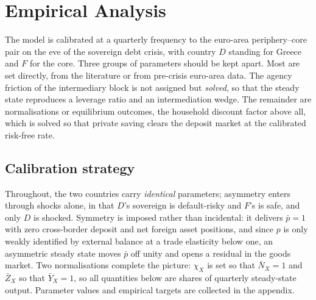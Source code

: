 \section{Empirical Analysis}
\label{sec:analysis}

The model is calibrated at a quarterly frequency to the euro-area
periphery--core pair on the eve of the sovereign debt crisis, with country $D$
standing for Greece and $F$ for the core. Three groups of parameters should be
kept apart. Most are set directly, from the literature or from pre-crisis
euro-area data. The agency friction of the intermediary block is not assigned but
\emph{solved}, so that the steady state reproduces a leverage ratio and an
intermediation wedge. The remainder are normalisations or equilibrium outcomes,
the household discount factor above all, which is solved so that private saving
clears the deposit market at the calibrated risk-free rate.

\subsection{Calibration strategy}
\label{sec:calibration}

Throughout, the two countries carry \emph{identical} parameters; asymmetry
enters through shocks alone, in that $D$'s sovereign is default-risky and $F$'s
is safe, and only $D$ is shocked. Symmetry is imposed rather than incidental: it
delivers $\bar p=1$ with zero cross-border deposit and net foreign asset
positions, and since $p$ is only weakly identified by external balance at a trade
elasticity below one, an asymmetric steady state moves $\bar p$ off unity and
opens a residual in the goods market. Two normalisations complete the picture:
$\chi_X$ is set so that $\bar N_X=1$ and $\bar Z_X$ so that $\bar Y_X=1$, so all
quantities below are shares of quarterly steady-state output. Parameter values
and empirical targets are collected in the appendix.

